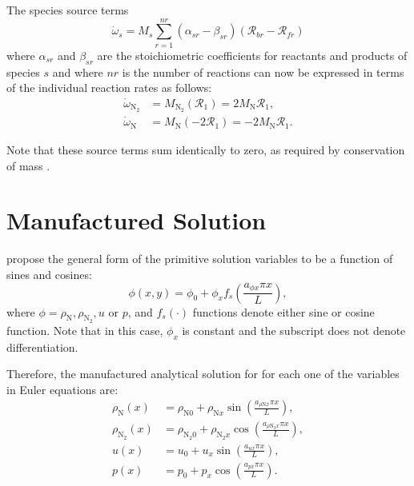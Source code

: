 \documentclass[10pt]{article}
\begin{document}
The species source terms \begin{equation}
  \dot{\omega}_s = M_s \sum_{r=1}^{nr}\left(\alpha_{sr}-\beta_{sr}\right)\left(\mathcal{R}_{br} - \mathcal{R}_{fr}\right)
\end{equation}
where $\alpha_{sr}$ and $\beta_{sr}$ are the stoichiometric coefficients for reactants and products of species $s$ and where $nr$ is the number of reactions can now be expressed in terms of the individual reaction rates as follows:
\begin{align*}
 \dot{\omega}_{\text{N}_2} &= M_{\text{N}_2}\left(\mathcal{R}_1\right)= 2 M_\text{N} \mathcal{R}_1 ,\\
 \dot{\omega}_{\text{N}} &= M_{\text{N}}\left(-2\mathcal{R}_1 \right)=-2 M_\text{N} \mathcal{R}_1. 
\end{align*}

Note that these source terms sum identically to zero, as required by conservation of mass \citep{Kessler2004}.

\section{Manufactured Solution}

\citet{Roy2002} propose the general form of the primitive solution variables to be a function of sines and cosines:
\begin{equation}
 \label{eq:manufactured01}
 \phi (x,y) = \phi_0+ \phi_x f_s\left(\frac{a_{\phi x} \pi x}{L}\right) ,
\end{equation}
where $\phi=\rho_{\text{N}},\rho_{\text{N}_2}, u$ or $p$, and $f_s(\cdot)$ functions denote either sine or cosine function. Note that in this case, $\phi_x$ is constant and the subscript does not denote differentiation.

Therefore, the manufactured analytical solution for for each one of the variables in Euler equations are:
\begin{equation}
\begin{split}
\label{eq:manufactured02}
\rho_{\text{N}}(x) &= \rho_{\text{N}0} + \rho_{\text{N}x} \sin\left(\frac{a_{  \rho \text{N} x }\pi x}{L}\right),\\
\rho_{\text{N}_2}(x) &= \rho_{\text{N}_2 0}+ \rho_{\text{N}_2 x} \cos\left(\frac{a_{ \rho \text{N}_2 x } \pi x}{L}\right),\\
u(x) &= u_{0}+u_{x} \sin\left(\frac{a_{u x} \pi x}{L}\right),\\
p(x) &= p_{0}+p_{x} \cos\left(\frac{a_{p x} \pi x}{L}\right).\\
\end{split}
\end{equation}
\end{document}
